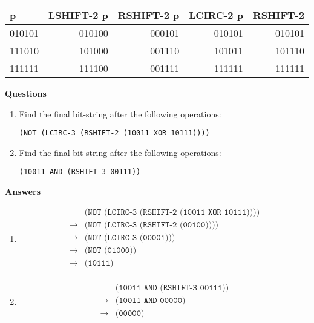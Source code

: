 \documentclass[12pt,letterpaper]{article}
\begin{document}
\begin{center}
  \begin{tabular}{| l || r | r | r | r |}
    \hline
    p & \textbf{LSHIFT-2} p & \textbf{RSHIFT-2} p & \textbf{LCIRC-2} p & \textbf{RSHIFT-2} \\
    \hline \hline
    010101 & 010100 & 000101 & 010101 & 010101 \\
    111010 & 101000 & 001110 & 101011 & 101110 \\
    111111 & 111100 & 001111 & 111111 & 111111 \\
    \hline
  \end{tabular}
\end{center}

\bigskip
\noindent \textbf{Questions}
\begin{enumerate}
\item Find the final bit-string after the following operations:

  \texttt{(NOT (LCIRC-3 (RSHIFT-2 (10011 XOR 10111))))}

\item Find the final bit-string after the following operations:

  \texttt{(10011 AND (RSHIFT-3 00111))}

\end{enumerate}

\pagebreak
\noindent \textbf{Answers}

\begin{enumerate}

\item \begin{align*}
  & \texttt{(NOT (LCIRC-3 (RSHIFT-2 (10011 XOR 10111))))} \\
  \rightarrow& \texttt{(NOT (LCIRC-3 (RSHIFT-2 (00100))))} \\
  \rightarrow& \texttt{(NOT (LCIRC-3 (00001)))} \\
  \rightarrow& \texttt{(NOT (01000))} \\
  \rightarrow& \texttt{(10111)} \\
\end{align*}

\item \begin{align*}
  & \texttt{(10011 AND (RSHIFT-3 00111))} \\
  \rightarrow& \texttt{(10011 AND 00000)} \\
  \rightarrow& \texttt{(00000)} \\
\end{align*}

\end{enumerate}
\end{document}
